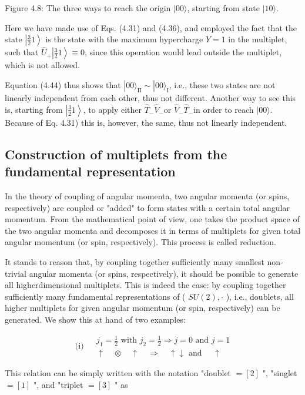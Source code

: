 \documentclass[10pt, letterpaper]{article}
\begin{document}
Figure 4.8: The three ways to reach the origin $|00\rangle$, starting from state $|10\rangle$.

Here we have made use of Eqs. (4.31) and (4.36), and employed the fact that the state $\left|\frac{3}{2} 1\right\rangle$ is the state with the maximum hypercharge $Y=1$ in the multiplet, such that $\hat{U}_{+}\left|\frac{3}{2} 1\right\rangle \equiv 0$, since this operation would lead outside the multiplet, which is not allowed.

Equation (4.44) thus shows that $|00\rangle_{\mathrm{II}} \sim|00\rangle_{\mathrm{I}}$, i.e., these two states are not linearly independent from each other, thus not different. Another way to see this is, starting from $\left|\frac{3}{2} 1\right\rangle$, to apply either $\hat{T}_{-} \hat{V}_{-}$or $\hat{V}_{-} \hat{T}_{-}$in order to reach $|00\rangle$. Because of Eq. 4.31) this is, however, the same, thus not linearly independent.

\subsection{Construction of multiplets from the fundamental representation}
In the theory of coupling of angular momenta, two angular momenta (or spins, respectively) are coupled or "added" to form states with a certain total angular momentum. From the mathematical point of view, one takes the product space of the two angular momenta and decomposes it in terms of multiplets for given total angular momentum (or spin, respectively). This process is called reduction.

It stands to reason that, by coupling together sufficiently many smallest non-trivial angular momenta (or spins, respectively), it should be possible to generate all higherdimensional multiplets. This is indeed the case: by coupling together sufficiently many fundamental representations of ( $S U(2), \cdot$ ), i.e., doublets, all higher multiplets for given angular momentum (or spin, respectively) can be generated. We show this at hand of two examples:

$$
\text { (i) } \begin{aligned}
& j_{1}=\frac{1}{2} \text { with } j_{2}=\frac{1}{2} \Longrightarrow j=0 \text { and } j=1 \\
& \uparrow \quad \otimes \quad \uparrow \quad \Longrightarrow \quad \uparrow \downarrow \text { and } \quad \uparrow
\end{aligned}
$$

This relation can be simply written with the notation "doublet $=[2]$ ", "singlet $=[1]$ ", and "triplet $=[3]$ " as
\end{document}
